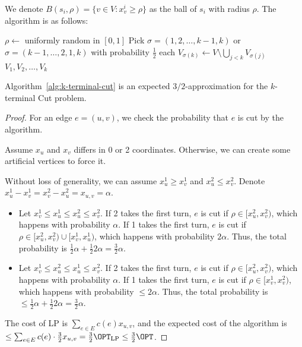We denote $B(s_i,\rho) = \{v\in V: x_v^i \ge \rho\}$ as the ball of $s_i$ with radius $\rho$. The algorithm is as follows:

\begin{algorithm}[H]
	\caption{Randomized Rounding for $k$-terminal Cut} \label{alg:k-terminal-cut}
	$\rho \gets$ uniformly random in $[0,1]$\;
	Pick $\sigma = (1, 2, \ldots, k-1, k)$ or $\sigma = (k-1, \ldots, 2, 1, k)$ with probability $\frac{1}{2}$ each\;
	$V_{\sigma(k)} \gets V \setminus \bigcup_{j<k} V_{\sigma(j)}$\;
	\Return $V_1, V_2, \ldots, V_k$\;
\end{algorithm}

\begin{theorem}
	Algorithm~\ref{alg:k-terminal-cut} is an expected $3/2$-approximation for the $k$-terminal Cut problem.
\end{theorem}
\begin{proof}
	For an edge $e=(u,v)$, we check the probability that $e$ is cut by the algorithm.

	Assume $x_u$ and $x_v$ differs in 0 or 2 coordinates. Otherwise, we can create some artificial vertices to force it.

	Without loss of generality, we can assume $x_u^1 \ge x_v^1$ and $x_u^2 \le x_v^2$. Denote $x_u^1 - x_v^1 = x_v^2 - x_u^2 = x_{u,v} = \alpha$.

	\begin{itemize}
		\item Let $x_v^1 \le x_u^1 \le x_u^2 \le x_v^2$. If 2 takes the first turn, $e$ is cut if $\rho \in [x_u^2, x_v^2)$, which happens with probability $\alpha$. If 1 takes the first turn, $e$ is cut if $\rho \in [x_u^2, x_v^2) \cup [x_v^1, x_u^1)$, which happens with probability $2\alpha$. Thus, the total probability is $\frac{1}{2}\alpha + \frac{1}{2}2\alpha = \frac{3}{2}\alpha$.
		\item Let $x_v^1 \le x_u^2 \le x_u^1 \le x_v^2$. If 2 takes the first turn, $e$ is cut if $\rho \in [x_u^2, x_v^2)$, which happens with probability $\alpha$. If 1 takes the first turn, $e$ is cut if $\rho \in [x_v^1, x_v^2)$, which happens with probability $\le 2\alpha$. Thus, the total probability is $\le\frac{1}{2}\alpha + \frac{1}{2}2\alpha = \frac{3}{2}\alpha$.
	\end{itemize}

	The cost of LP is $\sum_{e\in E} c(e) x_{u,v}$, and the expected cost of the algorithm is $\le\sum_{e\in E} c(e) \cdot \frac{3}{2} x_{u,v} = \frac{3}{2}\OPT_\text{LP} \le \frac{3}{2}\OPT$.

\end{proof}

